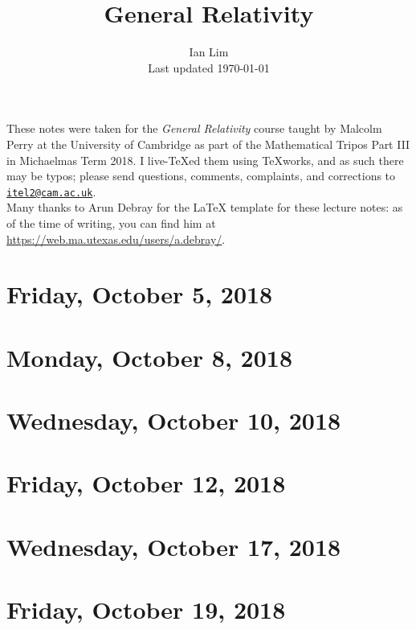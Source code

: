 \documentclass[reqno]{amsart}
\begin{document}
\title{General Relativity}
\author{Ian Lim\\ Last updated \today}
\maketitle
{\small\noindent These notes were taken for the \textit{General Relativity} course taught by Malcolm Perry at the University of Cambridge as part of the Mathematical Tripos Part III in Michaelmas Term 2018. I live-\TeX ed them using TeXworks, and as such there may be typos; please send questions, comments, complaints, and corrections to 
\href{mailto:itel2@cam.ac.uk?subject=GR\%20Lecture\%20Notes}{\texttt{itel2@cam.ac.uk}}.\\
Many thanks to Arun Debray for the {\LaTeX} template for these lecture notes: as of the time of writing, you can find him at \url{https://web.ma.utexas.edu/users/a.debray/}.}

\tableofcontents

\section{Friday, October 5, 2018}
	

\section{Monday, October 8, 2018}
	

\section{Wednesday, October 10, 2018}
	

\section{Friday, October 12, 2018}
	

\section{Wednesday, October 17, 2018}
    

\section{Friday, October 19, 2018}
    
    
\end{document}
